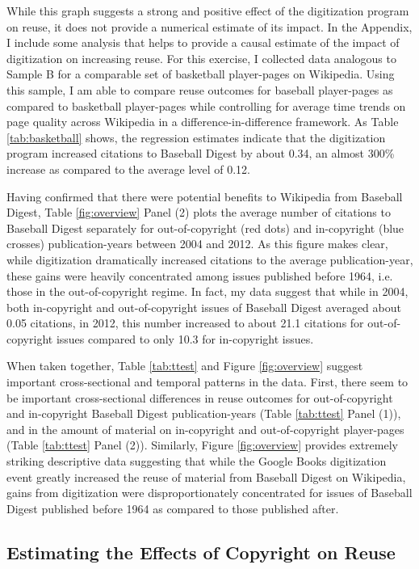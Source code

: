 \documentclass[11pt]{article}
\begin{document}
While this graph suggests a strong and positive effect of the digitization program on reuse, it does not provide a numerical estimate of its impact. In the Appendix, I include some analysis that helps to provide a causal estimate of the impact of digitization on increasing reuse. For this exercise, I collected data analogous to Sample B for a comparable set of basketball player-pages on Wikipedia. Using this sample, I am able to compare reuse outcomes for baseball player-pages as compared to basketball player-pages while controlling for average time trends on page quality across Wikipedia in a difference-in-difference framework. As Table \ref{tab:basketball} shows, the regression estimates indicate that the digitization program increased citations to Baseball Digest by about 0.34, an almost 300\% increase as compared to the average level of 0.12. 

Having confirmed that there were potential benefits to Wikipedia from Baseball Digest, Table \ref {fig:overview} Panel (2) plots the average number of citations to Baseball Digest separately for out-of-copyright (red dots) and in-copyright (blue crosses) publication-years between 2004 and 2012. As this figure makes clear, while digitization dramatically increased citations to the average publication-year, these gains were heavily concentrated among issues published before 1964, i.e. those in the out-of-copyright regime. In fact, my data suggest that while in 2004, both in-copyright and out-of-copyright issues of Baseball Digest averaged about 0.05 citations, in 2012, this number increased to about 21.1 citations for out-of-copyright issues compared to only 10.3 for in-copyright issues.

When taken together, Table \ref{tab:ttest} and Figure \ref{fig:overview} suggest important cross-sectional and temporal patterns in the data. First, there seem to be important cross-sectional differences in reuse outcomes for out-of-copyright and in-copyright Baseball Digest publication-years (Table \ref{tab:ttest} Panel (1)), and in the amount of material on in-copyright and out-of-copyright player-pages (Table \ref{tab:ttest} Panel (2)). Similarly, Figure \ref{fig:overview} provides extremely striking descriptive data suggesting that while the Google Books digitization event greatly increased the reuse of material from Baseball Digest on Wikipedia, gains from digitization were disproportionately concentrated for issues of Baseball Digest published before 1964 as compared to those published after. 

\subsection{Estimating the Effects of Copyright on Reuse}
\label{sec:maindd}
\end{document}
